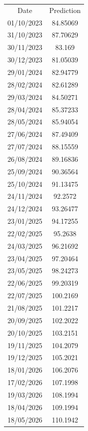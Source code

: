 \documentclass{apmcmthesis}
\begin{document}
\begin{longtable}{c c}
        Date       & Prediction \\
        01/10/2023 & 84.85069   \\
        31/10/2023 & 87.70629   \\
        30/11/2023 & 83.169     \\
        30/12/2023 & 81.05039   \\
        29/01/2024 & 82.94779   \\
        28/02/2024 & 82.61289   \\
        29/03/2024 & 84.50271   \\
        28/04/2024 & 85.37233   \\
        28/05/2024 & 85.94054   \\
        27/06/2024 & 87.49409   \\
        27/07/2024 & 88.15559   \\
        26/08/2024 & 89.16836   \\
        25/09/2024 & 90.36564   \\
        25/10/2024 & 91.13475   \\
        24/11/2024 & 92.2572    \\
        24/12/2024 & 93.26477   \\
        23/01/2025 & 94.17255   \\
        22/02/2025 & 95.2638    \\
        24/03/2025 & 96.21692   \\
        23/04/2025 & 97.20464   \\
        23/05/2025 & 98.24273   \\
        22/06/2025 & 99.20319   \\
        22/07/2025 & 100.2169   \\
        21/08/2025 & 101.2217   \\
        20/09/2025 & 102.2022   \\
        20/10/2025 & 103.2151   \\
        19/11/2025 & 104.2079   \\
        19/12/2025 & 105.2021   \\
        18/01/2026 & 106.2076   \\
        17/02/2026 & 107.1998   \\
        19/03/2026 & 108.1994   \\
        18/04/2026 & 109.1994   \\
        18/05/2026 & 110.1942   \\

\end{longtable}
\end{document}
